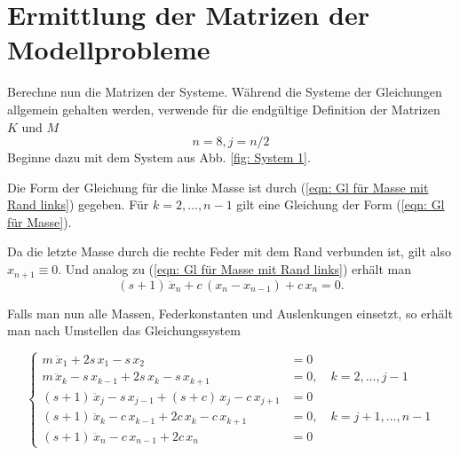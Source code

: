 \documentclass[a4paper,12pt]{report}
\newcommand{\1}{\mathds{1}}
\theoremstyle{plain} %
\theoremstyle{definition} %
\theoremstyle{remark}
\begin{document}

            
      \section{Ermittlung der Matrizen der Modellprobleme}
            Berechne nun die Matrizen der Systeme.
            Während die Systeme der Gleichungen allgemein gehalten werden, verwende für die endgültige Definition der Matrizen $K$ und $M$
            $$n=8, j=n/2$$ 
            Beginne dazu mit dem System aus Abb. \ref{fig: System 1}.

            Die Form der Gleichung für die linke Masse ist durch (\ref{eqn: Gl für Masse mit Rand links}) gegeben.
            Für $k=2,\dots, n-1$ gilt eine Gleichung der Form (\ref{eqn: Gl für Masse}).
            
            Da die letzte Masse durch die rechte Feder mit dem Rand verbunden ist, gilt also $x_{n+1} \equiv 0$.
            Und analog zu (\ref{eqn: Gl für Masse mit Rand links}) erhält man
            $$(s+1)\,\ddot x_n + c\,(x_n-x_{n-1}) + c\,x_n = 0.$$  

            Falls man nun alle Massen, Federkonstanten und Auslenkungen einsetzt, so erhält man nach Umstellen das Gleichungssystem

            
            $$\begin{cases}
                  m\ \ddot x_1 + 2s\,x_1 - s\,x_2 & = 0   \\
                  m\,\ddot x_k -s\,x_{k-1} + 2s\,x_k -s\,x_{k+1} & = 0,\quad k=2,\dots,j-1\\
                  (s+1)\,\ddot x_j -s\,x_{j-1} + (s+c)\,x_j -c\,x_{j+1} & = 0\\
                  (s+1)\,\ddot x_k -c\,x_{k-1} + 2c\,x_k -c\,x_{k+1} & = 0,\quad k=j+1,\dots,n-1\\
                  (s+1)\,\ddot x_n -c\,x_{n-1}+ 2c\,x_n & = 0
            \end{cases}$$
            
\end{document}
